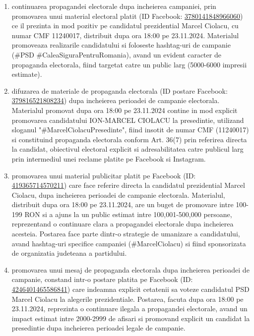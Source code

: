 \documentclass[a4paper,12pt]{article}
\begin{document}
\begin{enumerate}[leftmargin=*, label=\arabic*.)]
    \item continuarea propagandei electorale dupa incheierea campaniei, prin promovarea unui material electoral platit (ID Facebook: \href{https://www.facebook.com/ads/library/?id=3780141848966060}{3780141848966060}) ce il prezinta in mod pozitiv pe candidatul prezidential Marcel Ciolacu, cu numar CMF 11240017, distribuit dupa ora 18:00 pe 23.11.2024. Materialul promoveaza realizarile candidatului si foloseste hashtag-uri de campanie (\#PSD \#CaleaSiguraPentruRomania), avand un evident caracter de propaganda electorala, fiind targetat catre un public larg (5000-6000 impresii estimate).
    \item difuzarea de materiale de propaganda electorala (ID postare Facebook: \href{https://www.facebook.com/ads/library/?id=379816521808234}{379816521808234}) dupa incheierea perioadei de campanie electorala. Materialul promovat dupa ora 18:00 pe 23.11.2024 contine in mod explicit promovarea candidatului ION-MARCEL CIOLACU la presedintie, utilizand sloganul "\#MarcelCiolacuPresedinte", fiind insotit de numar CMF (11240017) si constituind propaganda electorala conform Art. 36(7) prin referirea directa la candidat, obiectivul electoral explicit si adresabilitatea catre publicul larg prin intermediul unei reclame platite pe Facebook si Instagram.
    \item promovarea unui material publicitar platit pe Facebook (ID: \href{https://www.facebook.com/ads/library/?id=419365714570211}{419365714570211}) care face referire directa la candidatul prezidential Marcel Ciolacu, dupa incheierea perioadei de campanie electorala. Materialul, distribuit dupa ora 18:00 pe 23.11.2024, are un buget de promovare intre 100-199 RON si a ajuns la un public estimat intre 100,001-500,000 persoane, reprezentand o continuare clara a propagandei electorale dupa incheierea acesteia. Postarea face parte dintr-o strategie de umanizare a candidatului, avand hashtag-uri specifice campaniei (\#MarcelCiolacu) si fiind sponsorizata de organizatia judeteana a partidului.
    \item promovarea unui mesaj de propaganda electorala dupa incheierea perioadei de campanie, constand intr-o postare platita pe Facebook (ID: \href{https://www.facebook.com/ads/library/?id=4246401465586841}{4246401465586841}) care indeamna explicit cetatenii sa voteze candidatul PSD Marcel Ciolacu la alegerile prezidentiale. Postarea, facuta dupa ora 18:00 pe 23.11.2024, reprezinta o continuare ilegala a propagandei electorale, avand un impact estimat intre 2000-2999 de afisari si promovand explicit un candidat la presedintie dupa incheierea perioadei legale de campanie.

\end{enumerate}
\end{document}
